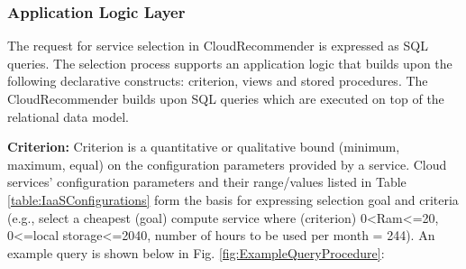 \subsubsection{Application Logic Layer}
The request for service selection in CloudRecommender is expressed as SQL queries.
The selection process supports an application logic that builds upon the following declarative constructs: criterion, views and stored procedures. The CloudRecommender builds upon SQL queries which are executed on top of the relational data model.

\textbf{Criterion:} Criterion is a quantitative or qualitative bound (minimum, maximum, equal) on the configuration parameters provided by a service. Cloud services’
configuration parameters and their range/values listed in
Table \ref{table:IaaSConfigurations} form the basis for
expressing selection goal and criteria (e.g., select a cheapest (goal) compute service where (criterion) 0<Ram<=20, 0<=local storage<=2040, number of hours to be used per month = 244). 
An example query is shown below in Fig. \ref{fig:ExampleQueryProcedure}:

